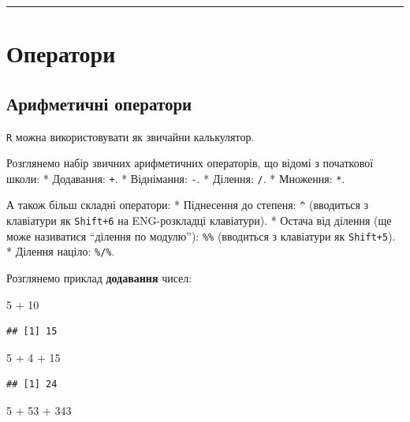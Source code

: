 \documentclass[
]{book}
\newenvironment{Shaded}{\begin{snugshade}}{\end{snugshade}}
\newcommand{\DecValTok}[1]{\textcolor[rgb]{0.00,0.00,0.81}{#1}}
\newcommand{\SpecialCharTok}[1]{\textcolor[rgb]{0.00,0.00,0.00}{#1}}
\begin{document}
\begin{center}\rule{0.5\linewidth}{0.5pt}\end{center}

\hypertarget{chapter23}{%
\section{Оператори}\label{chapter23}}

\hypertarget{chapter231}{%
\subsection{Арифметичні оператори}\label{chapter231}}

\texttt{R} можна використовувати як звичайни калькулятор.

Розглянемо набір звичних арифметичних операторів, що відомі з початкової школи:
* Додавання: \texttt{+}.
* Віднімання: \texttt{-}.
* Ділення: \texttt{/}.
* Множення: \texttt{*}.

А також більш складні оператори:
* Піднесення до степеня: \texttt{\^{}} (вводиться з клавіатури як \texttt{Shift+6} на ENG-розкладці клавіатури).
* Остача від ділення (ще може називатися ``ділення по модулю''): \texttt{\%\%} (вводиться з клавіатури як \texttt{Shift+5}).
* Ділення націло: \texttt{\%/\%}.

Розглянемо приклад \textbf{додавання} чисел:

\begin{Shaded}
\begin{Highlighting}[]
\DecValTok{5} \SpecialCharTok{+} \DecValTok{10}
\end{Highlighting}
\end{Shaded}

\begin{verbatim}
## [1] 15
\end{verbatim}

\begin{Shaded}
\begin{Highlighting}[]
\DecValTok{5} \SpecialCharTok{+} \DecValTok{4} \SpecialCharTok{+} \DecValTok{15}
\end{Highlighting}
\end{Shaded}

\begin{verbatim}
## [1] 24
\end{verbatim}

\begin{Shaded}
\begin{Highlighting}[]
\DecValTok{5} \SpecialCharTok{+} \DecValTok{53} \SpecialCharTok{+} \DecValTok{343}
\end{Highlighting}
\end{Shaded}
\end{document}
